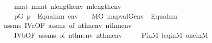 \begin{isabellebody}
\ \ \ \ {\isachardoublequoteopen}n{\isasymin}nat{\isachardoublequoteclose}\ {\isachardoublequoteopen}m{\isasymin}nat{\isachardoublequoteclose}\ {\isachardoublequoteopen}n{\isacharless}{\kern0pt}length{\isacharparenleft}{\kern0pt}env{\isacharparenright}{\kern0pt}{\isachardoublequoteclose}\ {\isachardoublequoteopen}m{\isacharless}{\kern0pt}length{\isacharparenleft}{\kern0pt}env{\isacharparenright}{\kern0pt}{\isachardoublequoteclose}\isanewline
\ \ \ \isanewline
\ \ \ \ {\isachardoublequoteopen}{\isacharparenleft}{\kern0pt}{\isasymexists}p{\isasymin}G{\isachardot}{\kern0pt}\ p\ {\isasymtturnstile}\ Equal{\isacharparenleft}{\kern0pt}n{\isacharcomma}{\kern0pt}m{\isacharparenright}{\kern0pt}\ env{\isacharparenright}{\kern0pt}\ \ {\isasymlongleftrightarrow}\ \ M{\isacharbrackleft}{\kern0pt}G{\isacharbrackright}{\kern0pt}{\isacharcomma}{\kern0pt}\ map{\isacharparenleft}{\kern0pt}val{\isacharparenleft}{\kern0pt}G{\isacharparenright}{\kern0pt}{\isacharcomma}{\kern0pt}env{\isacharparenright}{\kern0pt}\ {\isasymTurnstile}\ Equal{\isacharparenleft}{\kern0pt}n{\isacharcomma}{\kern0pt}m{\isacharparenright}{\kern0pt}{\isachardoublequoteclose}\isanewline
%
\isadelimproof
\ \ %
\endisadelimproof
%
\isatagproof
{}\isamarkupfalse%
\ assms\ IV{}{}{}a{\isacharparenleft}{\kern0pt}{}{\isacharparenright}{\kern0pt}{\isacharbrackleft}{\kern0pt}OF\ assms{\isacharparenleft}{\kern0pt}{}{\isacharparenright}{\kern0pt}{\isacharcomma}{\kern0pt}\ of\ {\isachardoublequoteopen}nth{\isacharparenleft}{\kern0pt}n{\isacharcomma}{\kern0pt}env{\isacharparenright}{\kern0pt}{\isachardoublequoteclose}\ {\isachardoublequoteopen}nth{\isacharparenleft}{\kern0pt}m{\isacharcomma}{\kern0pt}env{\isacharparenright}{\kern0pt}{\isachardoublequoteclose}{\isacharbrackright}{\kern0pt}\ \isanewline
\ \ \ \ IV{}{}{}b{\isacharparenleft}{\kern0pt}{}{\isacharparenright}{\kern0pt}{\isacharbrackleft}{\kern0pt}OF\ assms{\isacharparenleft}{\kern0pt}{}{\isacharparenright}{\kern0pt}{\isacharcomma}{\kern0pt}\ of\ {\isachardoublequoteopen}nth{\isacharparenleft}{\kern0pt}n{\isacharcomma}{\kern0pt}env{\isacharparenright}{\kern0pt}{\isachardoublequoteclose}\ {\isachardoublequoteopen}nth{\isacharparenleft}{\kern0pt}m{\isacharcomma}{\kern0pt}env{\isacharparenright}{\kern0pt}{\isachardoublequoteclose}{\isacharbrackright}{\kern0pt}\ \isanewline
\ \ \ \ P{\isacharunderscore}{\kern0pt}in{\isacharunderscore}{\kern0pt}M\ leq{\isacharunderscore}{\kern0pt}in{\isacharunderscore}{\kern0pt}M\ one{\isacharunderscore}{\kern0pt}in{\isacharunderscore}{\kern0pt}M\ \isanewline

\end{isabellebody}
